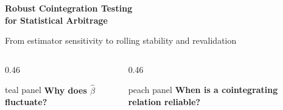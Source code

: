 \documentclass[aspectratio=169,10pt]{beamer}
\newenvironment{tealpanel}{\begin{beamercolorbox}[wd=\linewidth,sep=0.16cm,rounded=true]{teal panel}}{\end{beamercolorbox}}
\newenvironment{peachpanel}{\begin{beamercolorbox}[wd=\linewidth,sep=0.16cm,rounded=true]{peach panel}}{\end{beamercolorbox}}
\begin{document}
\begin{frame}[plain]
\vspace{0.82cm}
{\color{navy}\fontsize{24}{27}\selectfont\bfseries Robust Cointegration Testing\\for Statistical Arbitrage\par}
\vspace{0.42cm}
{\color{teal}\fontsize{11.5}{14}\selectfont From estimator sensitivity to rolling stability and revalidation\par}
\vspace{0.72cm}
\begin{columns}[T,onlytextwidth]
  \begin{column}{0.46\textwidth}
    \begin{tealpanel}
      \centering\color{navy}\bfseries Why does $\hat\beta$ fluctuate?
    \end{tealpanel}
  \end{column}
  \begin{column}{0.46\textwidth}
    \begin{peachpanel}
      \centering\color{navy}\bfseries When is a cointegrating relation reliable?
    \end{peachpanel}
  \end{column}
\end{columns}
\vfill

\end{frame}
\end{document}
